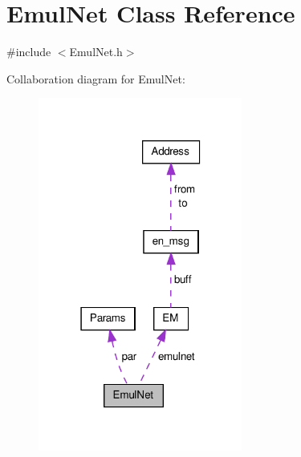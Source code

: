 \hypertarget{class_emul_net}{\section{\-Emul\-Net \-Class \-Reference}
\label{dc/db0/class_emul_net}
}


{\ttfamily \#include $<$\-Emul\-Net.\-h$>$}



\-Collaboration diagram for \-Emul\-Net\-:
\nopagebreak
\begin{figure}[H]
\begin{center}
\leavevmode
\includegraphics[width=190pt]{de/d5d/class_emul_net__coll__graph}
\end{center}
\end{figure}

